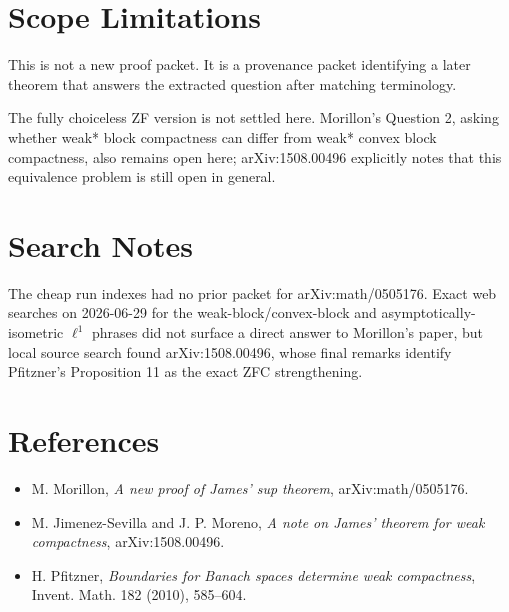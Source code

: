 \documentclass[11pt]{article}
\begin{document}
\section*{Scope Limitations}

This is not a new proof packet.  It is a provenance packet identifying a later theorem that answers the extracted question after matching terminology.

The fully choiceless ZF version is not settled here.  Morillon's Question 2, asking whether weak* block compactness can differ from weak* convex block compactness, also remains open here; arXiv:1508.00496 explicitly notes that this equivalence problem is still open in general.

\section*{Search Notes}

The cheap run indexes had no prior packet for arXiv:math/0505176.  Exact web searches on 2026-06-29 for the weak-block/convex-block and asymptotically-isometric \(\ell^1\) phrases did not surface a direct answer to Morillon's paper, but local source search found arXiv:1508.00496, whose final remarks identify Pfitzner's Proposition 11 as the exact ZFC strengthening.

\section*{References}

\begin{itemize}
\item M. Morillon, \emph{A new proof of James' sup theorem}, arXiv:math/0505176.
\item M. Jimenez-Sevilla and J. P. Moreno, \emph{A note on James' theorem for weak compactness}, arXiv:1508.00496.
\item H. Pfitzner, \emph{Boundaries for Banach spaces determine weak compactness}, Invent. Math. 182 (2010), 585--604.
\end{itemize}
\end{document}
